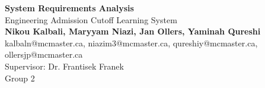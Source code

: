 \documentclass{article}
\begin{document}
	\begin{center}
        \topskip 0pt
        \vspace*{\fill}
    		\LARGE{\textbf{System Requirements Analysis}} \\
            \vspace{1em}
            \Large{Engineering Admission Cutoff Learning System} \\
            \vspace{1em}
            \normalsize\textbf{Nikou Kalbali, Maryyam Niazi, Jan Ollers, Yaminah Qureshi} \\
            \normalsize{kalbaln@mcmaster.ca, niazim3@mcmaster.ca, qureshiy@mcmaster.ca, ollersjp@mcmaster.ca} \\
            \vspace{1em}
            \normalsize{Supervisor: Dr. Frantisek Franek} \\
            \vspace{1em}
            \normalsize{Group 2} \\
    \vspace*{\fill}
	\end{center}
	
\end{document}
